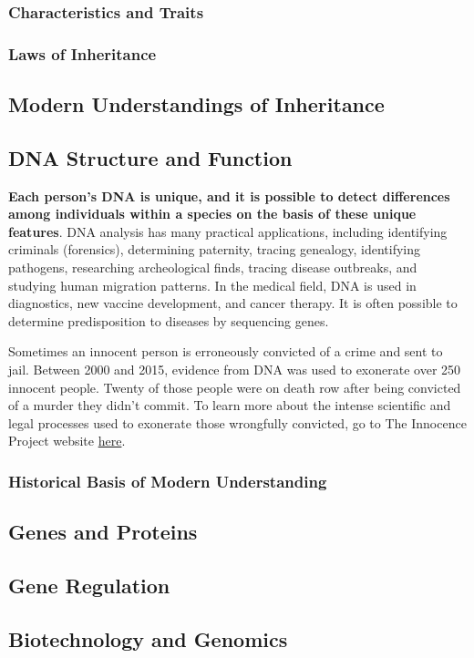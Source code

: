 \subsubsection{Characteristics and Traits}
\subsubsection{Laws of Inheritance}

\subsection{Modern Understandings of Inheritance}
\subsection{DNA Structure and Function}
\textbf{Each person’s DNA is unique, and it is possible to detect differences among individuals within a species on the basis of these unique features}. DNA analysis has many practical applications, including identifying criminals (forensics), determining paternity, tracing genealogy, identifying pathogens, researching archeological finds, tracing disease outbreaks, and studying human migration patterns. In the medical field, DNA is used in diagnostics, new vaccine development, and cancer therapy. It is often possible to determine predisposition to diseases by sequencing genes.

Sometimes an innocent person is erroneously convicted of a crime and sent to jail. Between 2000 and 2015, evidence from DNA was used to exonerate over 250 innocent people. Twenty of those people were on death row after being convicted of a murder they didn’t commit. To learn more about the intense scientific and legal processes used to exonerate those wrongfully convicted, go to The Innocence Project website \href{http://www.openstax.org/l/32innocence}{here}.
\subsubsection{Historical Basis of Modern Understanding}

\subsection{Genes and Proteins}
\subsection{Gene Regulation}
\subsection{Biotechnology and Genomics}

